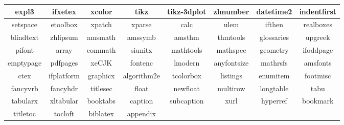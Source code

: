 

\begin{table}[h]
  \begin{tabular}{|c|c|c|c|c|c|c|c|}
  \hline
  expl3     & ifxetex    & xcolor   & tikz        & tikz-3dplot & zhnumber    & datetime2  & indentfirst \\ \hline
  setspace  & etoolbox   & xpatch   & xparse      & calc        & ulem        & ifthen     & realboxes   \\ \hline
  blindtext & zhlipsum   & amsmath  & amssymb     & amsthm      & thmtools    & glossaries & upgreek     \\ \hline
  pifont    & array      & commath  & siunitx     & mathtools   & mathspec    & geometry   & ifoddpage   \\ \hline
  emptypage & pdfpages   & xeCJK    & fontenc     & lmodern     & anyfontsize & mathrsfs   & amsfonts    \\ \hline
  ctex      & ifplatform & graphicx & algorithm2e & tcolorbox   & listings    & enumitem   & footmisc    \\ \hline
  fancyvrb  & fancyhdr   & titlesec & float       & newfloat    & multirow    & longtable  & tabu        \\ \hline
  tabularx  & xltabular  & booktabs & caption     & subcaption  & xurl        & hyperref   & bookmark    \\ \hline
  titletoc  & tocloft    & biblatex & appendix    &             &             &            &             \\ \hline
  \end{tabular}
\end{table}
